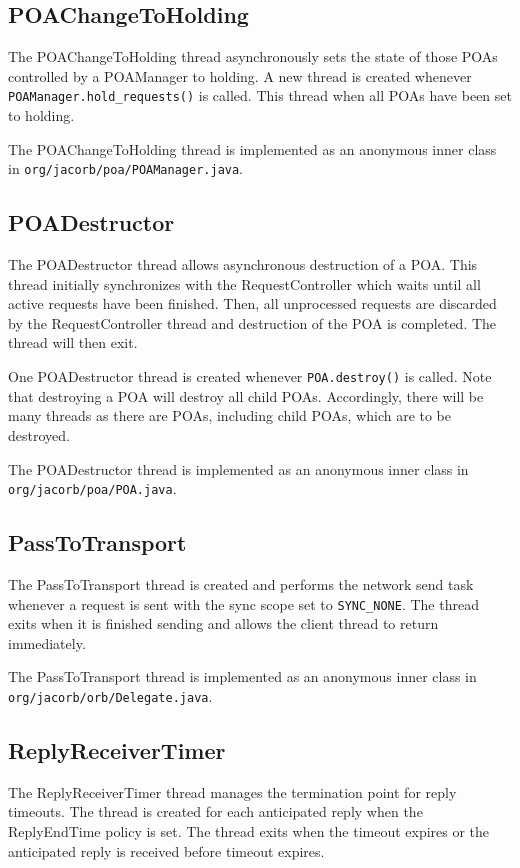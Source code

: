 \subsection*{POAChangeToHolding}
The POAChangeToHolding thread asynchronously sets the state of those POAs
controlled by a POAManager to holding. A new thread is created whenever
{\tt POAManager.hold\_requests()} is called. This thread when all POAs have
been set to holding.

The POAChangeToHolding thread is implemented as an anonymous inner class in
{\tt org/jacorb/poa/POAManager.java}.

\subsection*{POADestructor}
The POADestructor thread allows asynchronous destruction of a POA. This thread
initially synchronizes with the RequestController which waits until all active
requests have been finished. Then, all unprocessed requests are discarded
by the RequestController thread and destruction of the POA is completed. The
thread will then exit.

One POADestructor thread is created whenever {\tt POA.destroy()} is called.
Note that destroying a POA will destroy all child POAs. Accordingly, there will
be many threads as there are POAs, including child POAs, which are to be
destroyed.

The POADestructor thread is implemented as an anonymous inner class in
{\tt org/jacorb/poa/POA.java}.

\subsection*{PassToTransport}
The PassToTransport thread is created and performs the network send task
whenever a request is sent with the sync scope set to {\tt SYNC\_NONE}. The
thread exits when it is finished sending and allows the client thread to return
immediately.

The PassToTransport thread is implemented as an anonymous inner class in
{\tt org/jacorb/orb/Delegate.java}.

\subsection*{ReplyReceiverTimer}
The ReplyReceiverTimer thread manages the termination point for reply timeouts.
The thread is created for each anticipated reply when the ReplyEndTime
policy is set. The thread exits when the timeout expires or the
anticipated reply is received before timeout expires.

